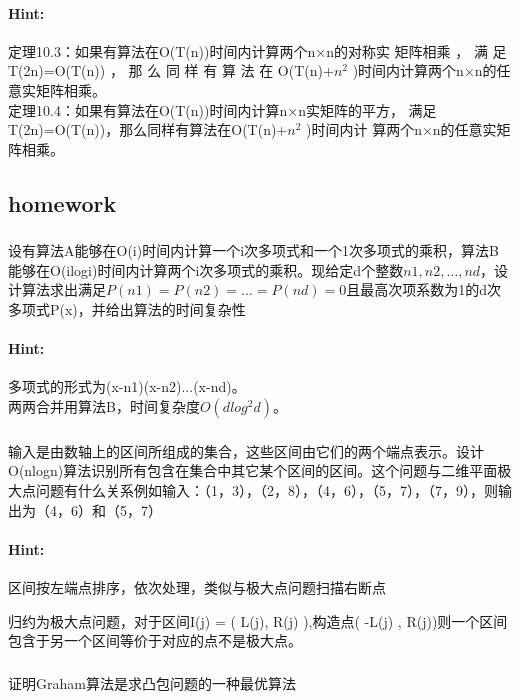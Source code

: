 \documentclass{article}
\begin{document}
 \paragraph{Hint:}定理10.3：如果有算法在O(T(n))时间内计算两个n×n的对称实
矩阵相乘 ， 满 足 T(2n)=O(T(n)) ， 那 么 同 样 有 算 法 在
O(T(n)+$n^2$
)时间内计算两个n×n的任意实矩阵相乘。\\
定理10.4：如果有算法在O(T(n))时间内计算n×n实矩阵的平方，
满足T(2n)=O(T(n))，那么同样有算法在O(T(n)+$n^2$
)时间内计
算两个n×n的任意实矩阵相乘。
    
      \subsection{homework}
      \subsubsection{}设有算法A能够在O(i)时间内计算一个i次多项式和一个1次多项式的乘积，算法B能够在O(ilogi)时间内计算两个i次多项式的乘积。现给定d个整数$n1,n2,…,nd$，设计算法求出满足$P(n1)=P(n2)=…=P(nd)=0$且最高次项系数为1的d次多项式P(x)，并给出算法的时间复杂性
     \paragraph{Hint:}
     多项式的形式为(x-n1)(x-n2)...(x-nd)。\\
     两两合并用算法B，时间复杂度$O(dlog^{2}d)$。\\
     
     \subsubsection{}输入是由数轴上的区间所组成的集合，这些区间由它们的两个端点表示。设计O(nlogn)算法识别所有包含在集合中其它某个区间的区间。这个问题与二维平面极大点问题有什么关系例如输入：（1，3），（2，8），（4，6），（5，7），（7，9），则输出为（4，6）和（5，7）     
     \paragraph{Hint:}区间按左端点排序，依次处理，类似与极大点问题扫描右断点
     
     归约为极大点问题，对于区间I(j) = ( L(j), R(j) ),构造点( -L(j) , R(j))则一个区间包含于另一个区间等价于对应的点不是极大点。\\
     
     \subsubsection{}证明Graham算法是求凸包问题的一种最优算法
\end{document}
